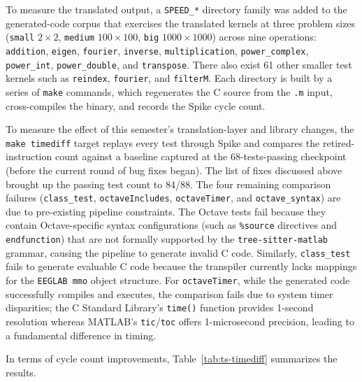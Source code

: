 To measure the translated output, a \texttt{SPEED\_*} directory family was added to the generated-code corpus that exercises the translated kernels at three problem sizes (\texttt{small} $2 \times 2$, \texttt{medium} $100 \times 100$, \texttt{big} $1000 \times 1000$) across nine operations: \texttt{addition}, \texttt{eigen}, \texttt{fourier}, \texttt{inverse}, \texttt{multiplication}, \texttt{power\_complex}, \texttt{power\_int}, \texttt{power\_double}, and \texttt{transpose}. There also exist 61 other smaller test kernels such as \texttt{reindex}, \texttt{fourier}, and \texttt{filterM}.  Each directory is built by a series of \texttt{make} commands, which regenerates the C source from the \texttt{.m} input, cross-compiles the binary, and records the Spike cycle count.

To measure the effect of this semester's translation-layer and library changes, the \texttt{make timediff} target replays every test through Spike and compares the retired-instruction count against a baseline captured at the 68-tests-passing checkpoint (before the current round of bug fixes began). The list of fixes discussed above brought up the passing test count to 84/88.  The four remaining comparison failures (\texttt{class\_test}, \texttt{octaveIncludes}, \texttt{octaveTimer}, and \texttt{octave\_syntax}) are due to pre-existing pipeline constraints. The Octave tests fail because they contain Octave-specific syntax configurations (such as \texttt{\%source} directives and \texttt{endfunction}) that are not formally supported by the \texttt{tree-sitter-matlab} grammar, causing the pipeline to generate invalid C code. Similarly, \texttt{class\_test} fails to generate evaluable C code because the transpiler currently lacks mappings for the \texttt{EEGLAB mmo} object structure. For \texttt{octaveTimer}, while the generated code successfully compiles and executes, the comparison fails due to system timer disparities; the C Standard Library's \texttt{time()} function provides 1-second resolution whereas MATLAB's \texttt{tic}/\texttt{toc} offers 1-microsecond precision, leading to a fundamental difference in timing.

In terms of cycle count improvements, Table~\ref{tab:ts-timediff} summarizes the results.




